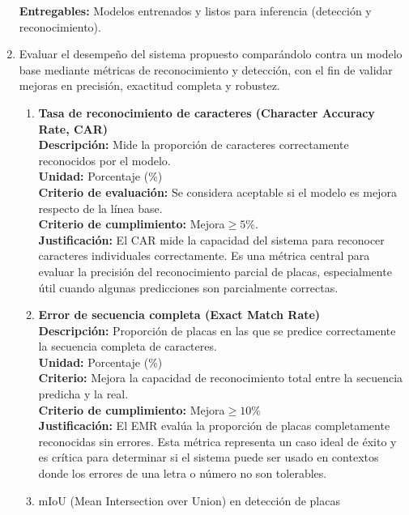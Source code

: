 \begin{enumerate}
		\textbf{Entregables:} Modelos entrenados y listos para inferencia (detección y reconocimiento).

	\item Evaluar el desempeño del sistema propuesto comparándolo contra un modelo base
		mediante métricas de reconocimiento y detección, con el fin de validar mejoras en precisión,
		exactitud completa y robustez.

		\begin{enumerate}
			\item \textbf{Tasa de reconocimiento de caracteres (Character Accuracy Rate, CAR)} \\
				\textbf{Descripción:} Mide la proporción de caracteres correctamente reconocidos por el modelo. \\
				\textbf{Unidad:} Porcentaje (\%) \\
				\textbf{Criterio de evaluación:} 
					Se considera aceptable si el modelo es mejora respecto de la línea base. \\
				\textbf{Criterio de cumplimiento:} Mejora$\geq 5\%$. \\
				\textbf{Justificación:}  El CAR mide la capacidad del sistema para reconocer caracteres individuales
				correctamente. Es una métrica central para evaluar la precisión del reconocimiento parcial de placas,
				especialmente útil cuando algunas predicciones son parcialmente correctas. \\
			\item \textbf{Error de secuencia completa (Exact Match Rate)} \\
				\textbf{Descripción:}
				Proporción de placas en las que se predice correctamente la secuencia completa de caracteres. \\
				\textbf{Unidad:} Porcentaje (\%) \\
				\textbf{Criterio:} Mejora la capacidad de reconocimiento total entre la secuencia predicha y la real. \\
				\textbf{Criterio de cumplimiento:} Mejora$\geq 10\%$ \\
				\textbf{Justificación:}  El EMR evalúa la proporción de placas completamente reconocidas sin errores.
				Esta métrica representa un caso ideal de éxito y es crítica para determinar si el sistema 
				puede ser usado en contextos donde los errores de una letra o número no son tolerables. \\
			\item mIoU (Mean Intersection over Union) en detección de placas \\

\end{enumerate}
\end{enumerate}

